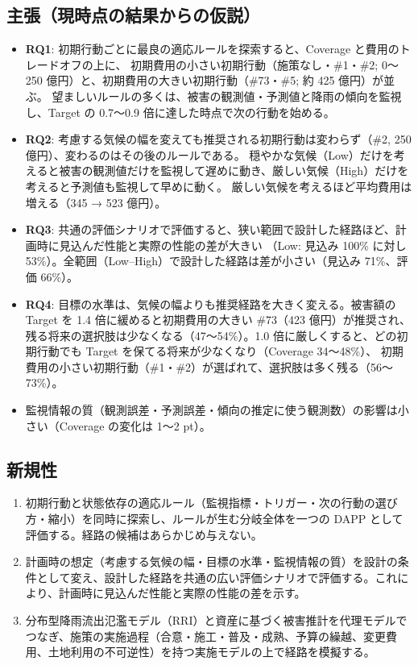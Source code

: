 \documentclass[a4paper,10pt]{ltjsarticle}
\begin{document}
\subsection{主張（現時点の結果からの仮説）}
\begin{itemize}
  \item \textbf{RQ1}: 初期行動ごとに最良の適応ルールを探索すると、Coverage と費用のトレードオフの上に、
    初期費用の小さい初期行動（施策なし・\#1・\#2; 0〜250 億円）と、初期費用の大きい初期行動（\#73・\#5; 約 425 億円）が並ぶ。
    望ましいルールの多くは、被害の観測値・予測値と降雨の傾向を監視し、Target の 0.7〜0.9 倍に達した時点で次の行動を始める。
  \item \textbf{RQ2}: 考慮する気候の幅を変えても推奨される初期行動は変わらず（\#2, 250 億円）、変わるのはその後のルールである。
    穏やかな気候（Low）だけを考えると被害の観測値だけを監視して遅めに動き、厳しい気候（High）だけを考えると予測値も監視して早めに動く。
    厳しい気候を考えるほど平均費用は増える（345 → 523 億円）。
  \item \textbf{RQ3}: 共通の評価シナリオで評価すると、狭い範囲で設計した経路ほど、計画時に見込んだ性能と実際の性能の差が大きい
    （Low: 見込み 100\% に対し 53\%）。全範囲（Low–High）で設計した経路は差が小さい（見込み 71\%、評価 66\%）。
  \item \textbf{RQ4}: 目標の水準は、気候の幅よりも推奨経路を大きく変える。被害額の Target を 1.4 倍に緩めると初期費用の大きい \#73（423 億円）が推奨され、
    残る将来の選択肢は少なくなる（47〜54\%）。1.0 倍に厳しくすると、どの初期行動でも Target を保てる将来が少なくなり（Coverage 34〜48\%）、
    初期費用の小さい初期行動（\#1・\#2）が選ばれて、選択肢は多く残る（56〜73\%）。
  \item 監視情報の質（観測誤差・予測誤差・傾向の推定に使う観測数）の影響は小さい（Coverage の変化は 1〜2 pt）。
\end{itemize}

\subsection{新規性}
\begin{enumerate}
  \item 初期行動と状態依存の適応ルール（監視指標・トリガー・次の行動の選び方・縮小）を同時に探索し、ルールが生む分岐全体を一つの DAPP として評価する。経路の候補はあらかじめ与えない。
  \item 計画時の想定（考慮する気候の幅・目標の水準・監視情報の質）を設計の条件として変え、設計した経路を共通の広い評価シナリオで評価する。これにより、計画時に見込んだ性能と実際の性能の差を示す。
  \item 分布型降雨流出氾濫モデル（RRI）と資産に基づく被害推計を代理モデルでつなぎ、施策の実施過程（合意・施工・普及・成熟、予算の繰越、変更費用、土地利用の不可逆性）を持つ実施モデルの上で経路を模擬する。
\end{enumerate}
\end{document}
